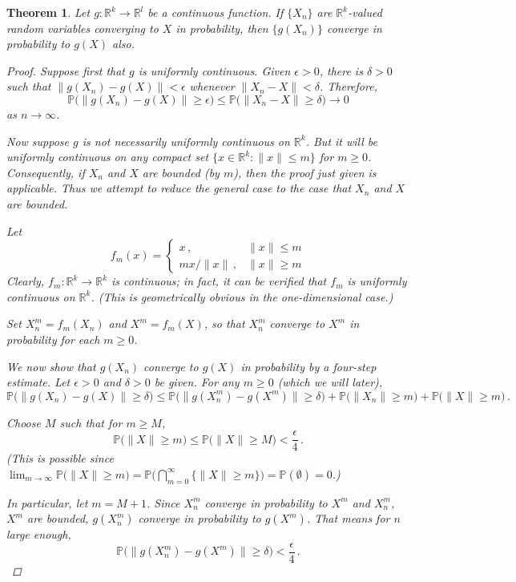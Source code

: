 \documentclass[12pt]{article}
\newcommand{\real}{\mathbb{R}}
\newcommand{\PP}{\mathbb{P}}
\providecommand{\norm}[1]{\lVert#1\rVert}
\newtheorem{thm}{Theorem}
\begin{document}
\begin{thm}
Let $g\colon \real^k \to \real^l$ be a continuous function.
If $\{ X_n \}$ are $\real^k$-valued random variables converging to $X$
in probability, then $\{ g(X_n) \}$ converge in probability to
$g(X)$ also.

\begin{proof}
Suppose first that $g$ is uniformly continuous.
Given $\epsilon > 0$, there is $\delta > 0$ such that
$\norm{g(X_n) - g(X)} < \epsilon$ whenever
$\norm{X_n - X} < \delta$.
Therefore,
\[
\PP \bigl( \norm{g(X_n) - g(X)} \geq \epsilon \bigr)
\leq \PP \bigl( \norm{X_n - X} \geq \delta \bigr) \to 0
\]
as $n \to \infty$.

Now suppose $g$ is not necessarily uniformly continuous on $\real^k$.
But it will be uniformly continuous on any compact set 
$\{ x \in \real^k \colon \norm{x} \leq m \}$ for $m \geq 0$.
Consequently, if $X_n$ and $X$ are bounded (by $m$), then the proof just
given is applicable.  Thus we attempt to reduce the general case
to the case that $X_n$ and $X$ are bounded.

Let 
\[
f_m(x) = \begin{cases}
x\,, & \norm{x} \leq m \\
mx/\norm{x} \,, & \norm{x} \geq m
\end{cases}
\]
Clearly, $f_m\colon \real^k \to \real^k$ is continuous; in fact, it can be verified that
$f_m$ is uniformly continuous on $\real^k$.  
(This is geometrically obvious in the one-dimensional case.)

Set $X_n^m = f_m(X_n)$ and $X^m = f_m(X)$,
so that $X_n^m$ converge to $X^m$ in probability for each $m \geq 0$.

We now show that $g(X_n)$ converge to $g(X)$ in probability by a four-step estimate.  Let $\epsilon > 0$ and $\delta > 0$ be given.
For any $m \geq 0$ (which we will  later),
\[
\PP\bigl( \norm{g(X_n) - g(X)} \geq \delta \bigr)
\leq \PP\bigl( \norm{g(X_n^m) - g(X^m) } \geq \delta \bigr)
+ \PP\bigl( \norm{X_n} \geq m \bigr) 
+ \PP\bigl( \norm{X} \geq m \bigr)\,.
\]

Choose $M$ such that for $m \geq M$,
\[
\PP\bigl( \norm{X} \geq m \bigr) \leq \PP \bigl( \norm{X} \geq M \bigr) < \frac{\epsilon}{4}\,.
\]
(This is possible since $\lim_{m \to \infty} \PP \bigl( \norm{X} \geq m \bigr)
= \PP \bigl( \bigcap_{m=0}^\infty \{ \norm{X} \geq m \} \bigr) = \PP(\emptyset) = 0$.)

In particular, let $m = M+1$.
Since $X_n^m$ converge in probability to $X^m$
and $X_n^m$, $X^m$ are bounded,
$g(X_n^m)$ converge in probability to $g(X^m)$.
That means for $n$ large enough, 
\[
\PP\bigl( \norm{g(X_n^m) - g(X^m)} \geq \delta \bigr) < \frac{\epsilon}{4}\,.
\]


\end{proof}
\end{thm}
\end{document}
